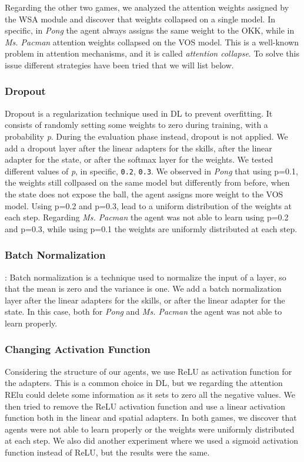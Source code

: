 Regarding the other two games, we analyzed the attention weights assigned by the WSA module and discover that weights collapsed on a single model.
In specific, in \textit{Pong} the agent always assigns the same weight to the OKK, while in \textit{Ms. Pacman} attention weights collapsed on the VOS model.
This is a well-known problem in attention mechanisms, and it is called \textit{attention collapse}.
To solve this issue different strategies have been tried that we will list below.

\subsubsection{Dropout}
Dropout is a regularization technique used in DL to prevent overfitting.
It consists of randomly setting some weights to zero during training, with a probability \textit{p}.
During the evaluation phase instead, dropout is not applied.
We add a dropout layer after the linear adapters for the skills, after the linear adapter for the state, or after the softmax layer for the weights.
We tested different values of \textit{p}, in specific, \texttt{0.2}, \texttt{0.3}.
We observed in \textit{Pong} that using p=0.1, the weights still collpased on the same model but differently from before, when the state does not expose the ball, the agent assigns more weight to the VOS model.
Using p=0.2 and p=0.3, lead to a uniform distribution of the weights at each step.
Regarding \textit{Ms. Pacman} the agent was not able to learn using p=0.2 and p=0.3, while using p=0.1 the weights are uniformly distributed at each step.




\subsubsection{Batch Normalization}:
Batch normalization is a technique used to normalize the input of a layer, so that the mean is zero and the variance is one.
We add a batch normalization layer after the linear adapters for the skills, or after the linear adapter for the state.
In this case, both for \textit{Pong} and \textit{Ms. Pacman} the agent was not able to learn properly.

\subsubsection{Changing Activation Function}
Considering the structure of our agents, we use ReLU as activation function for the adapters.
This is a common choice in DL, but we regarding the attention RElu could delete some information as it sets to zero all the negative values.
We then tried to remove the ReLU activation function and use a linear activation function both in the linear and spatial adapters.
In both games, we discover that agents were not able to learn properly or the weights were uniformly distributed at each step.
We also did another experiment where we used a sigmoid activation function instead of ReLU, but the results were the same.

